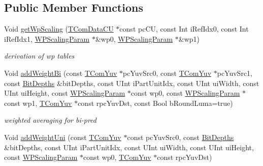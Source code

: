 \subsection*{Public Member Functions}
\begin{DoxyCompactItemize}
\item 
\mbox{\label{class_t_com_weight_prediction_ae4992636776e89db63001c2b1155a246}} 
Void \hyperlink{class_t_com_weight_prediction_ae4992636776e89db63001c2b1155a246}{get\+Wp\+Scaling} (\hyperlink{class_t_com_data_c_u}{T\+Com\+Data\+CU} $\ast$const pc\+CU, const Int i\+Ref\+Idx0, const Int i\+Ref\+Idx1, \hyperlink{struct_w_p_scaling_param}{W\+P\+Scaling\+Param} $\ast$\&wp0, \hyperlink{struct_w_p_scaling_param}{W\+P\+Scaling\+Param} $\ast$\&wp1)
\begin{DoxyCompactList}\small\item\em derivation of wp tables \end{DoxyCompactList}\item 
\mbox{\label{class_t_com_weight_prediction_a61c142b657d627e52c225898a2e34793}} 
Void \hyperlink{class_t_com_weight_prediction_a61c142b657d627e52c225898a2e34793}{add\+Weight\+Bi} (const \hyperlink{class_t_com_yuv}{T\+Com\+Yuv} $\ast$pc\+Yuv\+Src0, const \hyperlink{class_t_com_yuv}{T\+Com\+Yuv} $\ast$pc\+Yuv\+Src1, const \hyperlink{struct_bit_depths}{Bit\+Depths} \&bit\+Depths, const U\+Int i\+Part\+Unit\+Idx, const U\+Int ui\+Width, const U\+Int ui\+Height, const \hyperlink{struct_w_p_scaling_param}{W\+P\+Scaling\+Param} $\ast$const wp0, const \hyperlink{struct_w_p_scaling_param}{W\+P\+Scaling\+Param} $\ast$const wp1, \hyperlink{class_t_com_yuv}{T\+Com\+Yuv} $\ast$const rpc\+Yuv\+Dst, const Bool b\+Round\+Luma=true)
\begin{DoxyCompactList}\small\item\em weighted averaging for bi-\/pred \end{DoxyCompactList}\item 
\mbox{\label{class_t_com_weight_prediction_a98ef87ca5c2b0e3a3a6456c1983c86d0}} 
Void \hyperlink{class_t_com_weight_prediction_a98ef87ca5c2b0e3a3a6456c1983c86d0}{add\+Weight\+Uni} (const \hyperlink{class_t_com_yuv}{T\+Com\+Yuv} $\ast$const pc\+Yuv\+Src0, const \hyperlink{struct_bit_depths}{Bit\+Depths} \&bit\+Depths, const U\+Int i\+Part\+Unit\+Idx, const U\+Int ui\+Width, const U\+Int ui\+Height, const \hyperlink{struct_w_p_scaling_param}{W\+P\+Scaling\+Param} $\ast$const wp0, \hyperlink{class_t_com_yuv}{T\+Com\+Yuv} $\ast$const rpc\+Yuv\+Dst)

\end{DoxyCompactItemize}
